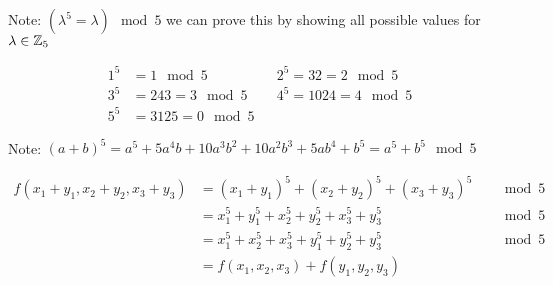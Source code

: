 \documentclass[12pt]{article} %
\begin{document}
\begin{homeworkProblem}
    Note: $(\lambda^5 = \lambda) \mod{5}$ we can prove this by showing all possible values for $\lambda \in \mathbb{Z}_5$

    \begin{align*}
        1^5 & = 1 \mod{5}        &  & 2^5 = 32 = 2 \mod{5}   \\
        3^5 & = 243 = 3 \mod{5}  &  & 4^5 = 1024 = 4 \mod{5} \\
        5^5 & = 3125 = 0 \mod{5}
    \end{align*}

    Note: $(a + b)^5 = a^5 + 5 a^4 b + 10 a^3 b^2 + 10 a^2 b^3 + 5 a b^4 + b^5 = a^5 + b^5 \mod{5}$

    \begin{align*}
        f(x_1 + y_1, x_2 + y_2, x_3  + y_3)
         & = (x_1 + y_1)^5 + (x_2 + y_2)^5 + (x_3  + y_3)^5 &  & \mod{5} \\
         & = x_1^5 + y_1^5 + x_2^5 + y_2^5 + x_3^5 + y_3^5  &  & \mod{5} \\
         & = x_1^5 + x_2^5 + x_3^5 + y_1^5 + y_2^5 + y_3^5  &  & \mod{5} \\
         & = f(x_1, x_2, x_3) + f(y_1, y_2, y_3)
    \end{align*}

\end{homeworkProblem}

\pagebreak
\end{document}
